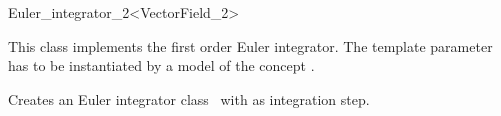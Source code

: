 
\begin{ccRefFunctionObjectClass}{Euler_integrator_2<VectorField_2>}  %

\ccDefinition

This class implements the first order Euler integrator. The template parameter
 has to be instantiated by a model of the concept
.

\ccCreation
{}
{Creates an Euler integrator class \ccVar \ with  as integration step.}


\ccIsModel 

 \\


\ccSeeAlso
{} \\
\end{ccRefFunctionObjectClass}


